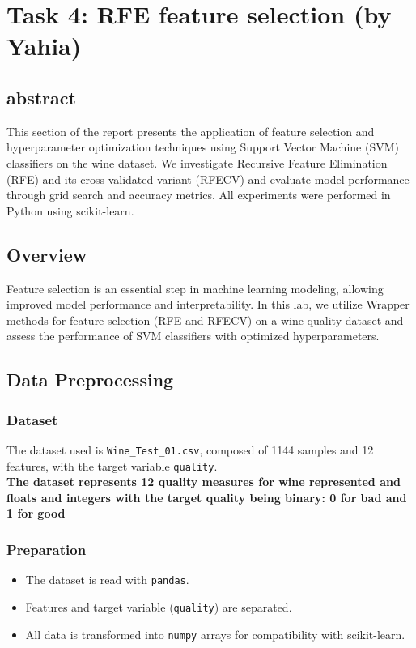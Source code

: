 \section{Task 4: RFE feature selection (by Yahia)}

\subsection{abstract}
This section of the report presents the application of feature selection and hyperparameter optimization techniques using Support Vector Machine (SVM) classifiers on the wine dataset. We investigate Recursive Feature Elimination (RFE) and its cross-validated variant (RFECV) and evaluate model performance through grid search and accuracy metrics. All experiments were performed in Python using scikit-learn.

\subsection{Overview}
Feature selection is an essential step in machine learning modeling, allowing improved model performance and interpretability. In this lab, we utilize Wrapper methods for feature selection (RFE and RFECV) on a wine quality dataset and assess the performance of SVM classifiers with optimized hyperparameters.

\subsection{Data Preprocessing}

\subsubsection{Dataset}
The dataset used is \texttt{Wine\_Test\_01.csv}, composed of 1144 samples and 12 features, with the target variable \texttt{quality}.\\
\textbf{The dataset represents 12 quality measures for wine represented and floats and integers with the target quality being binary: 0 for bad and 1 for good}

\subsubsection{Preparation}
\begin{itemize}
    \item The dataset is read with \texttt{pandas}.
    \item Features and target variable (\texttt{quality}) are separated.
    \item All data is transformed into \texttt{numpy} arrays for compatibility with scikit-learn.
\end{itemize}

